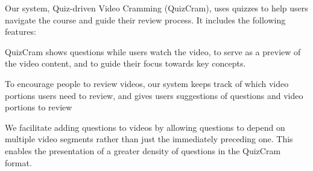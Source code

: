 \documentclass{sigchi}
\begin{document}

Our system, Quiz-driven Video Cramming (QuizCram), uses quizzes to help users navigate the course and guide their review process. It includes the following features:

\begin{compactitem}
\item QuizCram shows questions while users watch the video, to serve as a preview of the video content, and to guide their focus towards key concepts.
\item To encourage people to review videos, our system keeps track of which video portions users need to review, and gives users suggestions of questions and video portions to review %
\item We facilitate adding questions to videos by allowing questions to depend on multiple video segments rather than just the immediately preceding one. This enables the presentation of a greater density of questions in the QuizCram format.
\end{compactitem}
\end{document}
